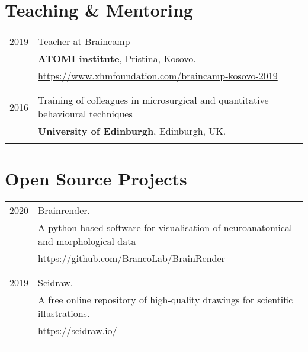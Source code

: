 \documentclass[a4paper,10pt]{article}
\begin{document}
\section{Teaching \& Mentoring}
\begin{tabular}{rl}	

    2019 & Teacher at Braincamp \\& 
    \normalsize\textbf{ATOMI institute}, Pristina, Kosovo.\\& 
    \small \url{https://www.xhmfoundation.com/braincamp-kosovo-2019}\\
    \\&\\

    2016 & Training of colleagues in microsurgical and quantitative behavioural techniques \\& 
    \normalsize\textbf{University of Edinburgh}, Edinburgh, UK.
    \\&\\

\end{tabular}

\section{Open Source Projects}
\begin{tabular}{rl}	

    \textsc{2020}& Brainrender. \\& 
    \small A python based software for visualisation of neuroanatomical and morphological data \\& 
    \small \url{https://github.com/BrancoLab/BrainRender}\\
    \\&\\

    \textsc{2019}& Scidraw.  \\& 
    \small A free online repository of high-quality drawings for scientific illustrations. \\& 
    \small \url{https://scidraw.io/}\\
    \\&\\

\end{tabular}
\end{document}
